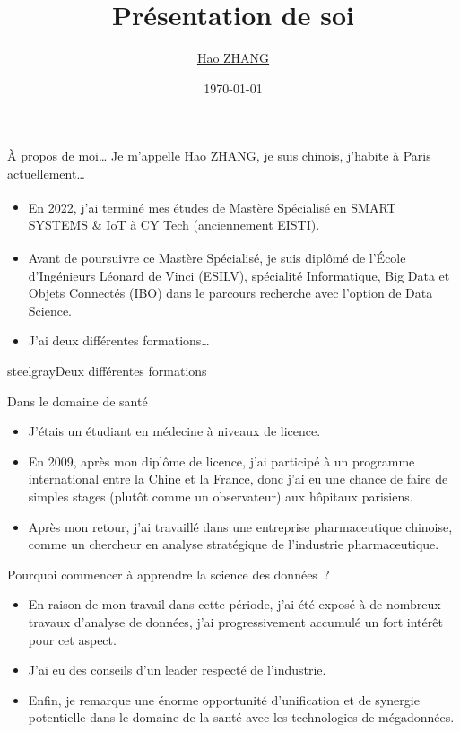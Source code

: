 \documentclass{beamer}
\title{Présentation de soi}
\author{\href{mailto:haozhang@me.com}{Hao ZHANG}}
\date{\today}
\begin{document}
	\maketitle
	
	
	\begin{frame}{À propos de moi…}
		Je m'appelle Hao ZHANG,  je suis chinois, j'habite à Paris actuellement…
		\begin{itemize}
			\item En 2022, j'ai terminé mes études de Mastère Spécialisé\textsuperscript{\textregistered} en SMART SYSTEMS \& IoT à CY Tech (anciennement EISTI).
			\item Avant de poursuivre ce Mastère Spécialisé\textsuperscript{\textregistered}, je suis diplômé de l'École d'Ingénieurs Léonard de Vinci (ESILV), spécialité Informatique, Big Data et Objets Connectés (IBO) dans le parcours recherche avec l'option de Data Science.
			\item J'ai deux différentes formations…
		\end{itemize}
	\end{frame}
	
	\begin{chapter}{steelgray}{Deux différentes formations}
	\end{chapter}
	
	\begin{frame}[fragile]{Dans le domaine de santé}
		\begin{itemize}[<+->]
			\item J'étais un étudiant en médecine à niveaux de licence.
			\item En 2009, après mon diplôme de licence, j'ai participé à un programme international entre la Chine et la France, donc j'ai eu une chance de faire de simples stages (plutôt comme un observateur) aux hôpitaux parisiens.
			\item Après mon retour, j'ai travaillé dans une entreprise pharmaceutique chinoise, comme un chercheur en analyse stratégique de l'industrie pharmaceutique.
		\end{itemize}
	\end{frame}
	
	\begin{frame}[fragile]{Pourquoi commencer à apprendre la science des données ?}
		\begin{itemize}[<+->]
			\item En raison de mon travail dans cette période, j'ai été exposé à de nombreux travaux d'analyse de données, j'ai progressivement accumulé un fort intérêt pour cet aspect.
			\item J'ai eu des conseils d'un leader respecté de l'industrie.
			\item Enfin, je remarque une énorme opportunité d'unification et de synergie potentielle dans le domaine de la santé avec les technologies de mégadonnées.
		\end{itemize}
	\end{frame}
	
\end{document}
